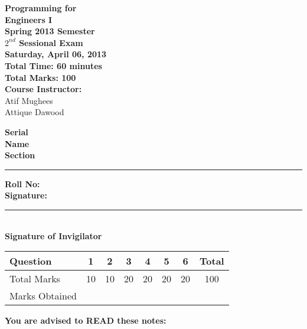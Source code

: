 \documentclass[12pt,a4paper]{article}
\def\QOne{10}
\def\Qtwo{10}
\def\Qthree{20}
\def\Qfour{20}
\def\Qfive{20}
\def\Qsix{20}
\def\TotalMarks{100}
\begin{document}
\begin{minipage}{0.55\textwidth}
{\LARGE \textbf{Programming for\\ Engineers I}}\\[0.15cm]
{\normalsize \textbf{Spring 2013 Semester}}\\
{\Large \textbf{$2^{nd}$ Sessional Exam}}\\
{\normalsize \textbf{Saturday, April 06, 2013}}\\[0.30cm]
{\Large \textbf{Total Time: 60 minutes}}\\[0.15cm]
{\Large \textbf{Total Marks: 100}}\\
\textbf{Course Instructor:}\\
Atif Mughees\\
Attique Dawood\\
\end{minipage}
\begin{minipage}{0.4\textwidth}
\textbf{Serial} \hrulefill \\[0.25cm]
\textbf{Name} \hrulefill\\[0.25cm]
\textbf{Section} \rule{1cm}{0.2mm} \textbf{Roll No:} \hrulefill\\[0.25cm]
\textbf{Signature:} \hrulefill\\[0.25cm]
\rule{6.6cm}{0.2mm}\\
\textbf{Signature of Invigilator}\\[0.25cm]
\end{minipage}
\begin{table}[H]
\begin{center}
\vspace{0.3cm}
	{\Large \begin{tabular}{|l|c|c|c|c|c|c|c|}
	\hline
		\rule{0pt}{2.6ex} Question & \textbf{1} & \textbf{2} & \textbf{3} & \textbf{4} & \textbf{5} & \textbf{6} & \textbf{Total}\\
		\hline
		Total Marks \rule{0pt}{2.6ex} & \QOne & \Qtwo & \Qthree & \Qfour & \Qfive & \Qsix & \TotalMarks\\
		\hline
		Marks Obtained & & & & & & &\\
	\hline
	\end{tabular}}
\end{center}
\end{table}
\noindent \textbf{You are advised to READ these notes:}
\end{document}
